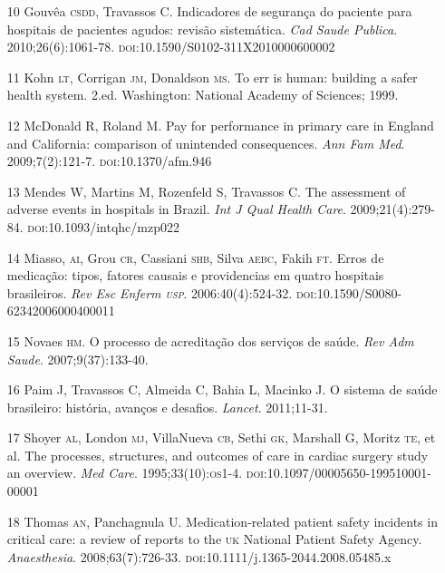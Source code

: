 \documentclass{article}
\begin{document}
\begin{itemize}
\item[10] Gouvêa \textsc{csdd}, Travassos C. Indicadores de segurança do paciente para
hospitais de pacientes agudos: revisão sistemática. \textit{Cad Saude Publica}.
2010;26(6):1061-78. \textsc{doi}:10.1590/S0102-311X2010000600002

\item[11] Kohn \textsc{lt}, Corrigan \textsc{jm}, Donaldson \textsc{ms}. To err is human: building a
safer
health system. 2.ed. Washington: National Academy of Sciences; 1999.

\item[12] McDonald R, Roland M. Pay for performance in primary care in England
and
California: comparison of unintended consequences. \textit{Ann Fam Med}.
2009;7(2):121-7. \textsc{doi}:10.1370/afm.946

\item[13] Mendes W, Martins M, Rozenfeld S, Travassos C. The assessment of
adverse
events in hospitals in Brazil. \textit{Int J Qual Health Care}.
2009;21(4):279-84. \textsc{doi}:10.1093/intqhc/mzp022

\item[14] Miasso, \textsc{ai}, Grou \textsc{cr}, Cassiani \textsc{shb}, Silva \textsc{aebc}, Fakih \textsc{ft}. Erros de
medicação: tipos, fatores causais e providencias em quatro hospitais
brasileiros.
\textit{Rev Esc Enferm \textsc{usp}}. 2006:40(4):524-32.
\textsc{doi}:10.1590/S0080-62342006000400011

\item[15] Novaes \textsc{hm}. O processo de acreditação dos serviços de saúde.
\textit{Rev
Adm Saude}. 2007;9(37):133-40.

\item[16] Paim J, Travassos C, Almeida C, Bahia L, Macinko J. O sistema de
saúde
brasileiro: história, avanços e desafios. \textit{Lancet}.
2011;11-31.

\item[17] Shoyer \textsc{al}, London \textsc{mj}, VillaNueva \textsc{cb}, Sethi \textsc{gk}, Marshall G, Moritz
\textsc{te}, et
al. The processes, structures, and outcomes of care in cardiac surgery study an
overview.
\textit{Med Care}. 1995;33(10):\textsc{os}1-4.
\textsc{doi}:10.1097/00005650-199510001-00001

\item[18] Thomas \textsc{an}, Panchagnula U. Medication-related patient safety
incidents in
critical care: a review of reports to the \textsc{uk} National Patient Safety Agency.
\textit{Anaesthesia}. 2008;63(7):726-33.
\textsc{doi}:10.1111/j.1365-2044.2008.05485.x


\end{itemize}
\end{document}
